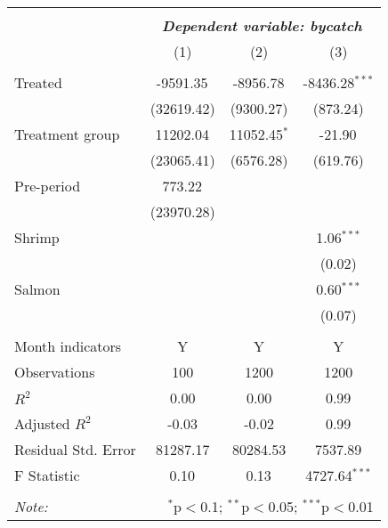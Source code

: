 
\begin{tabular}{@{\extracolsep{5pt}}lccc}
\\[-1.8ex]\hline
\hline \\[-1.8ex]
& \multicolumn{3}{c}{\textit{\textbf{Dependent variable: bycatch}}} \
\cr \cline{2-4}
\\[-1.8ex] & (1) & (2) & (3) \\
\hline \\[-1.8ex]
 Treated & -9591.35$^{}$ & -8956.78$^{}$ & -8436.28$^{***}$ \\
& (32619.42) & (9300.27) & (873.24) \\
 Treatment group & 11202.04$^{}$ & 11052.45$^{*}$ & -21.90$^{}$ \\
& (23065.41) & (6576.28) & (619.76) \\
 Pre-period & 773.22$^{}$ & & \\
& (23970.28) & & \\
 Shrimp & & & 1.06$^{***}$ \\
& & & (0.02) \\
 Salmon & & & 0.60$^{***}$ \\
& & & (0.07) \\
\hline \\[-1.8ex]
 Month indicators & Y & Y & Y \\
 Observations & 100 & 1200 & 1200 \\
 $R^2$ & 0.00 & 0.00 & 0.99 \\
 Adjusted $R^2$ & -0.03 & -0.02 & 0.99 \\
 Residual Std. Error & 81287.17 & 80284.53 & 7537.89 \\
 F Statistic & 0.10$^{}$ & 0.13$^{}$ & 4727.64$^{***}$ \\
\hline
\hline \\[-1.8ex]
\textit{Note:} & \multicolumn{3}{r}{$^{*}$p$<$0.1; $^{**}$p$<$0.05; $^{***}$p$<$0.01} \\
\end{tabular}
